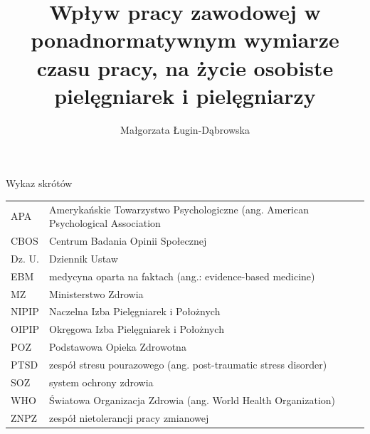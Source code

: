 \documentclass[a4paper,12pt,twoside,openright]{mwrep}
\title{Wpływ pracy zawodowej w ponadnormatywnym wymiarze czasu pracy, na życie osobiste pielęgniarek i pielęgniarzy}
\author{Małgorzata Ługin-Dąbrowska}
\newcommand{\nocontentsline}[3]{}
\newcommand{\tocless}[2]{\bgroup\let\addcontentsline=\nocontentsline#1{#2}\egroup}
\begin{document}
\sloppy
\maketitle


\tableofcontents


\newpage


\Large Wykaz skrótów
\normalsize



\begin{table}[ht]
    
    \label{tab:index}
	\begin{tabular}{  l  l  }
	
    APA & Amerykańskie Towarzystwo Psychologiczne (ang. American Psychological Association	\\
	
	CBOS & Centrum Badania Opinii Społecznej\\

	Dz. U. & Dziennik Ustaw\\

	EBM & medycyna oparta na faktach (ang.: evidence-based medicine)\\

	MZ & Ministerstwo Zdrowia\\

	NIPIP & Naczelna Izba Pielęgniarek i Położnych\\

	OIPIP & Okręgowa Izba Pielęgniarek i Położnych\\

	POZ & Podstawowa Opieka Zdrowotna\\

	PTSD & zespół stresu pourazowego (ang. post-traumatic stress disorder)\\

	SOZ & system ochrony zdrowia\\

	WHO & Światowa Organizacja Zdrowia (ang. World Health Organization)\\

	ZNPZ & zespół nietolerancji pracy zmianowej \\

	
	\end{tabular}
   

\end{table}
\end{document}
